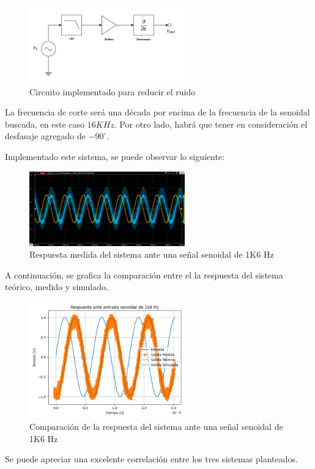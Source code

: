 \begin{figure}[H]
    \centering
    \includegraphics[width=0.6\textwidth]{../Ejercicio3-CircuitoIntegradoresyDerivadores/Imagenes/Derivador/circuito_thd.png}
    \caption{Circuito implementado para reducir el ruido}

\end{figure}
La frecuencia de corte será una década por encima de la frecuencia de la senoidal buscada, en este caso $16KHz$. 
Por otro lado,
habrá que tener en consideración el desfasaje agregado de $-90^\circ$. \par 
Implementado este sistema, se puede observar lo siguiente:

\begin{figure}[H]
    \centering
    \includegraphics[width=0.6\textwidth]{../Ejercicio3-CircuitoIntegradoresyDerivadores/Imagenes/Derivador/captura_sen.png}
    \caption{Respuesta medida del sistema ante una señal senoidal de 1K6 Hz}

\end{figure}

A continuación, se grafica la comparación entre el la respuesta del sistema 
teórico, medido y simulado.
\begin{figure}[H]
    \centering
    \includegraphics[width=0.6\textwidth]{../Ejercicio3-CircuitoIntegradoresyDerivadores/Imagenes/Derivador/rta_sen_1k6.png}
    \caption{Comparación de la respuesta del sistema ante una señal senoidal de 1K6 Hz}

\end{figure}
Se puede apreciar una excelente correlación entre los tres sistemas planteados.

